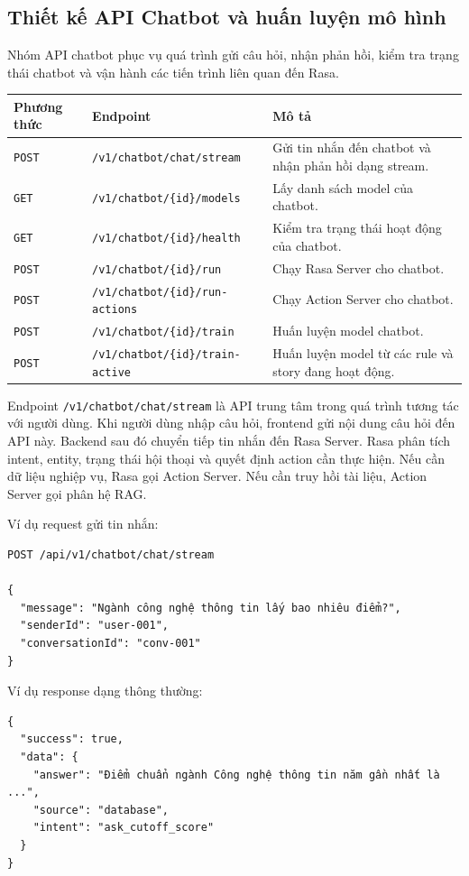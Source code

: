 \subsection{Thiết kế API Chatbot và huấn luyện mô hình}

Nhóm API chatbot phục vụ quá trình gửi câu hỏi, nhận phản hồi, kiểm tra trạng thái chatbot và vận hành các tiến trình liên quan đến Rasa.

\begin{longtable}{|p{3cm}|p{5cm}|p{7cm}|}
\hline
\textbf{Phương thức} & \textbf{Endpoint} & \textbf{Mô tả} \\
\hline
\texttt{POST} & \texttt{/v1/chatbot/chat/stream} & Gửi tin nhắn đến chatbot và nhận phản hồi dạng stream. \\
\hline
\texttt{GET} & \texttt{/v1/chatbot/\{id\}/models} & Lấy danh sách model của chatbot. \\
\hline
\texttt{GET} & \texttt{/v1/chatbot/\{id\}/health} & Kiểm tra trạng thái hoạt động của chatbot. \\
\hline
\texttt{POST} & \texttt{/v1/chatbot/\{id\}/run} & Chạy Rasa Server cho chatbot. \\
\hline
\texttt{POST} & \texttt{/v1/chatbot/\{id\}/run-actions} & Chạy Action Server cho chatbot. \\
\hline
\texttt{POST} & \texttt{/v1/chatbot/\{id\}/train} & Huấn luyện model chatbot. \\
\hline
\texttt{POST} & \texttt{/v1/chatbot/\{id\}/train-active} & Huấn luyện model từ các rule và story đang hoạt động. \\
\hline
\end{longtable}

Endpoint \texttt{/v1/chatbot/chat/stream} là API trung tâm trong quá trình tương tác với người dùng. Khi người dùng nhập câu hỏi, frontend gửi nội dung câu hỏi đến API này. Backend sau đó chuyển tiếp tin nhắn đến Rasa Server. Rasa phân tích intent, entity, trạng thái hội thoại và quyết định action cần thực hiện. Nếu cần dữ liệu nghiệp vụ, Rasa gọi Action Server. Nếu cần truy hồi tài liệu, Action Server gọi phân hệ RAG.

Ví dụ request gửi tin nhắn:

\begin{verbatim}
POST /api/v1/chatbot/chat/stream

{
  "message": "Ngành công nghệ thông tin lấy bao nhiêu điểm?",
  "senderId": "user-001",
  "conversationId": "conv-001"
}
\end{verbatim}

Ví dụ response dạng thông thường:

\begin{verbatim}
{
  "success": true,
  "data": {
    "answer": "Điểm chuẩn ngành Công nghệ thông tin năm gần nhất là ...",
    "source": "database",
    "intent": "ask_cutoff_score"
  }
}
\end{verbatim}
